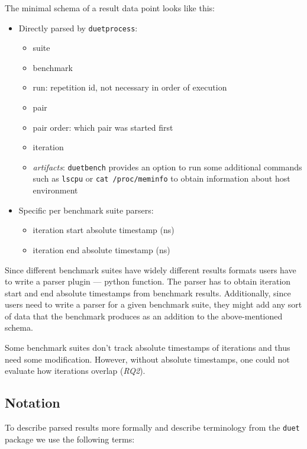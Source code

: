 The minimal schema of a result data point looks like this:
\begin{itemize}
    \item Directly parsed by \lstinline{duetprocess}:
        \begin{itemize}
            \item suite
            \item benchmark
            \item run: repetition id, not necessary in  order of execution
            \item pair
            \item pair order: which pair was started first
            \item iteration
            \item \emph{artifacts}: \lstinline{duetbench} provides an option to run some additional commands such as \lstinline{lscpu} or \lstinline{cat /proc/meminfo} to obtain information about host environment
        \end{itemize}
    \item Specific per benchmark suite parsers:
        \begin{itemize}
            \item iteration start absolute timestamp (ns)
            \item iteration end absolute timestamp (ns)
        \end{itemize}
\end{itemize}

Since different benchmark suites have widely different results formats users have to write a parser plugin --- python function.
The parser has to obtain iteration start and end absolute timestamps from benchmark results. 
Additionally, since users need to write a parser for a given benchmark suite, they might add any sort of data that the benchmark produces as an addition to the above-mentioned schema.

Some benchmark suites don't track absolute timestamps of iterations and thus need some modification.
However, without absolute timestamps, one could not evaluate how iterations overlap (\emph{RQ2}).

\subsection{Notation}
\label{sec:notation}

To describe parsed results more formally and describe terminology from the \lstinline{duet} package we use the following terms:

